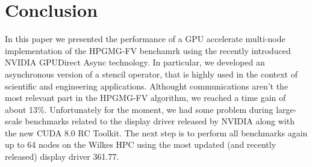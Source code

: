 \documentclass[conference]{IEEEtran}
\begin{document}
%




\section{Conclusion}

In this paper we presented the performance of a GPU accelerate multi-node
implementation of the HPGMG-FV benchamrk using the recently introduced
NVIDIA GPUDirect Async technology.
% 
In particular, we developed an asynchronous version of a stencil
operator, that is highly used in the context of scientific and engineering
applications.  Althought communications aren't the most relevant part in
the HPGMG-FV algorithm, we reached a time gain of about 13\%.
%
Unfortunately for the moment, we had some problem during large-scale benchmarks related to the display driver released by NVIDIA along with the new CUDA 8.0 RC Toolkit.
The next step is to perform all benchmarks again up to 64 nodes on the Wilkes HPC using the most updated (and recently released) display driver 361.77.
\end{document}
